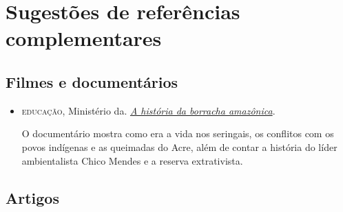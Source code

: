 \documentclass[11pt]{extarticle}
\begin{document}
\section{Sugestões de referências complementares}

\subsection{Filmes e documentários} 
\begin{itemize}

\item \textsc{educação}, Ministério da. \href{https://www.youtube.com/watch?v=_qoIDCSBNsI}{\textit{A história da borracha amazônica}}. 

O documentário mostra como era a vida nos seringais, os conflitos com os povos indígenas e as 
queimadas do Acre, além de contar a história do líder ambientalista Chico Mendes e a reserva extrativista.

\end{itemize}

\subsection{Artigos}
\end{document}
